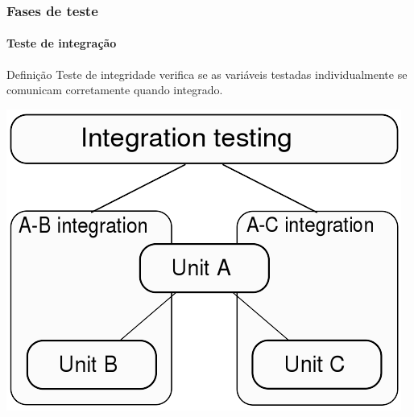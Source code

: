 \begin{frame}
\label{concept:integration-testing}
\frametitle{Fases de teste}
\framesubtitle{Teste de integração}

\begin{block:concept}{Definição}
Teste de integridade verifica se as variáveis testadas individualmente se comunicam corretamente quando integrado.
\end{block:concept}

\begin{block:fact}{}
    \centering
    \includegraphics[scale=.3]{teste-de-software/conceitos-basicos/Imagens/integration-testing}
\end{block:fact}

\hfill
{}
\end{frame}



